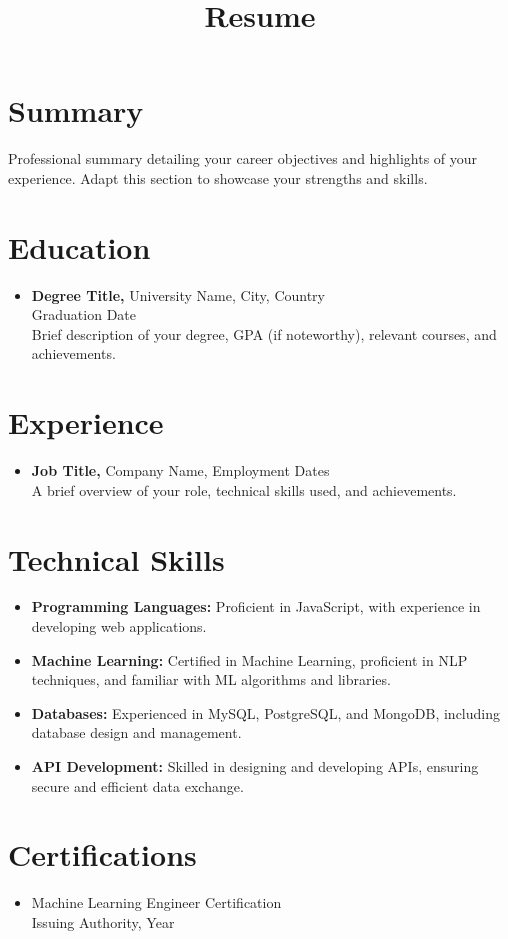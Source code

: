 \documentclass{resume}
\begin{document}

\title{Resume}

\begin{resume}

\section{Summary}
Professional summary detailing your career objectives and highlights of your experience. Adapt this section to showcase your strengths and skills.

\section{Education}
\begin{itemize}
\item[\textbullet] \textbf{Degree Title,} University Name, City, Country \\
Graduation Date \\
Brief description of your degree, GPA (if noteworthy), relevant courses, and achievements.
\end{itemize}

\section{Experience}
\begin{itemize}
\item[\textbullet] \textbf{Job Title,} Company Name, Employment Dates \\
A brief overview of your role, technical skills used, and achievements.
\end{itemize}

\section{Technical Skills}
\begin{itemize}
\item[\textbullet] \textbf{Programming Languages:} Proficient in JavaScript, with experience in developing web applications.
\item[\textbullet] \textbf{Machine Learning:} Certified in Machine Learning, proficient in NLP techniques, and familiar with ML algorithms and libraries.
\item[\textbullet] \textbf{Databases:} Experienced in MySQL, PostgreSQL, and MongoDB, including database design and management.
\item[\textbullet] \textbf{API Development:} Skilled in designing and developing APIs, ensuring secure and efficient data exchange.
\end{itemize}

\section{Certifications}
\begin{itemize}
\item[\textbullet] Machine Learning Engineer Certification \\
Issuing Authority, Year
\end{itemize}

\end{resume}
\end{document}
